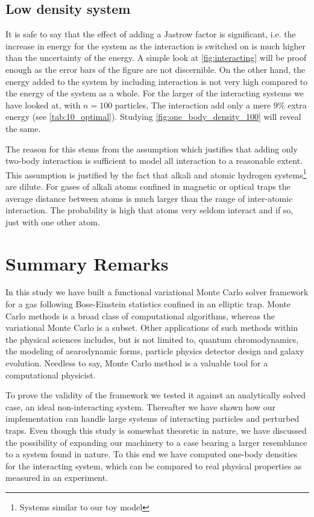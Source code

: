 \documentclass[
    a4paper, aps, twocolumn, floatfix, superscriptaddress,
    nofootinbib]{revtex4-1}
\newcommand{\1}{\mathds{1}}
\begin{document}
    \subsection{Low density system}
        It is safe to say that the effect of adding a Jastrow factor is significant,
        i.e. the increase in
            energy for the system as the interaction is switched on is much higher
            than the uncertainty of the energy. A simple look at \autoref{fig:interacting}
            will be proof enough as the error bars of the figure are not discernible.
        On the other hand, the energy added to the system by including interaction
        is not very high compared to the energy of the system as a whole. For the
        larger of the interacting systems we have looked at, with $n=100$ particles,
        The interaction add only a mere $9\%$ extra energy (see \autoref{tab:10_optimal}).
        Studying \autoref{fig:one_body_density_100} will reveal the same.

        The reason for this stems from the assumption which justifies that
        adding only two-body interaction is sufficient to model all interaction to a
        reasonable extent. This assumption is justified by the fact that alkali and
        atomic hydrogen systems\footnote{Systems similar to our toy model}
        are dilute. For gases of alkali atoms confined in magnetic or optical traps
        the average distance between atoms is much larger than the range of
        inter-atomic interaction. The probability is high that atoms very seldom
        interact and if so, just with one other atom.

\section{Summary Remarks}

    In this study we have built a functional variational Monte Carlo solver framework for
    a gas following Bose-Einstein statistics confined in an elliptic trap. Monte Carlo
    methods is a broad class of computational algorithms, whereas the variational
    Monte Carlo is a subset. Other applications of such methods within the physical
    sciences includes, but is not limited to, quantum chromodynamics, the modeling of
    aearodynamic forms, particle physics detector design and galaxy evolution.
    Needless to say, Monte Carlo method is a valuable tool for a computational physicist.

    To prove the
    validity of the framework we tested it against an analytically solved case, an ideal
    non-interacting system. Thereafter we have shown how our implementation can
    handle large systems of interacting particles and perturbed traps. Even though
    this study is somewhat theoretic in nature, we have discussed the possibility of
    expanding our machinery to a case bearing a larger resemblance to a system
    found in nature. To this end we have computed one-body densities for the
    interacting system, which can be compared to real physical properties as
    measured in an experiment.
\end{document}
